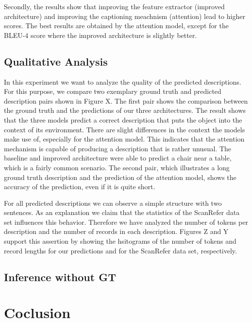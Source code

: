 \documentclass[10pt,twocolumn,letterpaper]{article}
\begin{document}
Secondly, the results show that improving the feature extractor (improved architecture) and improving the captioning meachnism (attention) lead to higher scores. The best results are obtained by the attention model, except for the BLEU-4 score where the improved architecture is slightly better.                

\subsection{Qualitative Analysis}
In this experiment we want to analyze the quality of the predicted descriptions. For this purpose, we compare two exemplary ground truth and predicted description pairs shown in Figure X. 
The first pair shows the comparison between the ground truth and the predictions of our three architectures. The result shows that the three models predict a correct description that puts the object into the context of its environment. There are slight differences in the context the models make use of, especially for the attention model. This indicates that the attention mechanism is capable of producing a description that is rather unusual. The baseline and improved architecture were able to predict a chair near a table, which is a fairly common scenario. 
The second pair, which illustrates a long ground truth description and the prediction of the attention model, shows the accuracy of the prediction, even if it is quite short. 

For all predicted descriptions we can observe a simple structure with two sentences. As an explanation we claim that the statistics of the ScanRefer data set influences this behavior. Therefore we have analyzed the number of tokens per description and the number of records in each description. Figures Z and Y support this assertion by showing the hsitograms of the number of tokens and record lengths for our predictions and for the ScanRefer data set, respectively.


\subsection{Inference without GT}

\section{Coclusion}
\end{document}
